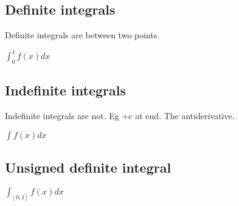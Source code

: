 
\subsection{Definite integrals}

Definite integrals are between two points.

\(\int_0^1f(x)dx\)

\subsection{Indefinite integrals}

Indefinite integrals are not. Eg +c at end. The antiderivative.

\(\int f(x)dx\)

\subsection{Unsigned definite integral}

\(\int_{[0,1]}f(x)dx\)

